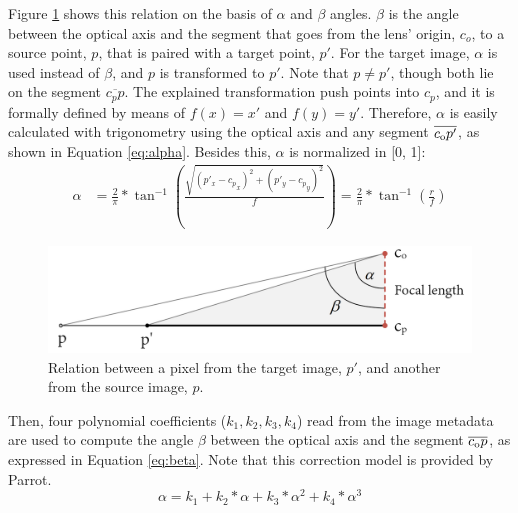 Figure \ref{fig:fisheye_model} shows this relation on the basis of $\alpha$ and $\beta$ angles. $\beta$ is the angle between the optical axis and the segment that goes from the lens' origin, $c_o$, to a source point, $p$, that is paired with a target point, $p'$. For the target image, $\alpha$ is used instead of $\beta$, and $p$ is transformed to $p'$. Note that $p \neq p'$, though both lie on the segment $\overline{c_p p}$. The explained transformation push points into $c_p$, and it is formally defined by means of $f(x) = x'$ and $f(y) = y'$. Therefore, $\alpha$ is easily calculated with trigonometry using the optical axis and any segment $\overline{c\textsubscript{o}p'}$, as shown in Equation \ref{eq:alpha}. Besides this, $\alpha$ is normalized in [0, 1]:
\begin{equation}
\begin{split}
\label{eq:alpha}
\alpha & = \frac{2}{\pi} * \tan^{-1}(\frac{\sqrt{(p'_x-{c_p}_x)^2 + (p'_y-{c_p}_y)^2}}{f}) = \frac{2}{\pi} * \tan^{-1}(\frac{r}{f})
\end{split}
\end{equation}

\begin{figure}[ht]
	\centering
	\includegraphics[width=\linewidth]{figs/materials/fisheye_model_2.png}
	\caption{Relation between a pixel from the target image, $p'$, and another from the source image, $p$.}
	\label{fig:fisheye_model}
\end{figure}

Then, four polynomial coefficients ($k_1, k_2, k_3, k_4$) read from the image metadata are used to compute the angle $\beta$ between the optical axis and the segment $\overline{c\textsubscript{o}p}$, as expressed in Equation \ref{eq:beta}. Note that this correction model is provided by Parrot.
\begin{equation}
\label{eq:beta}
\alpha = k_1 + k_2 * \alpha + k_3 * \alpha ^ 2 + k_4 * \alpha ^ 3
\end{equation}

